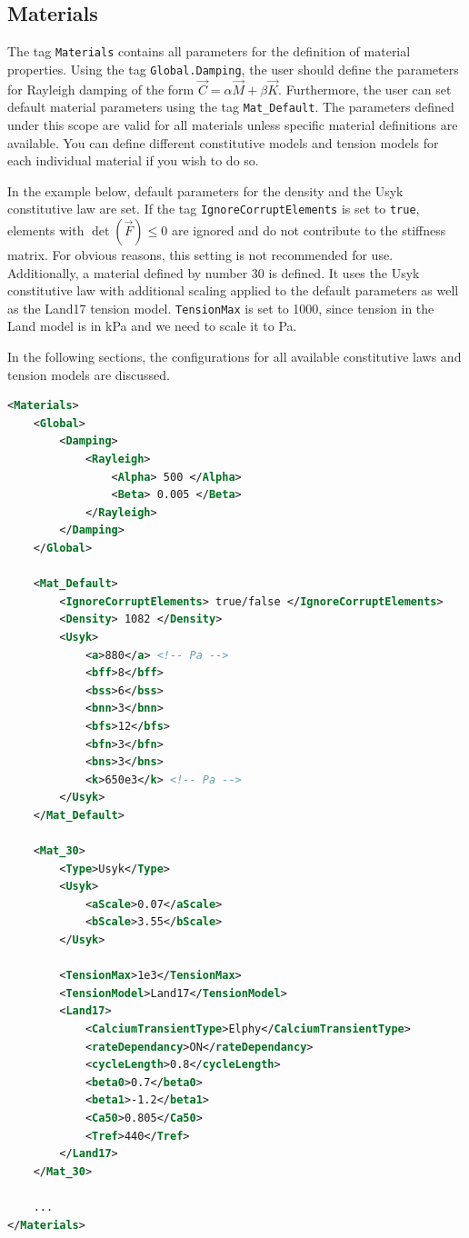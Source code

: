 \subsection{Materials}
\label{settings:Material}

The tag \verb|Materials| contains all parameters for the definition of material properties.
Using the tag \verb|Global.Damping|, the user should define the parameters for Rayleigh damping of the form $\vec C = \alpha \vec M + \beta \vec K$.
Furthermore, the user can set default material parameters using the tag \verb|Mat_Default|.
The parameters defined under this scope are valid for all materials unless specific material definitions are available.
You can define different constitutive models and tension models for each individual material if you wish to do so.

In the example below, default parameters for the density and the Usyk constitutive law are set.
If the tag \verb|IgnoreCorruptElements| is set to \verb|true|, elements with $\det(\vec F) \leq 0$ are ignored and do not contribute to the stiffness matrix.
For obvious reasons, this setting is not recommended for use.
Additionally, a material defined by number 30 is defined.
It uses the Usyk constitutive law with additional scaling applied to the default parameters as well as the Land17 tension model.
\verb|TensionMax| is set to 1000, since tension in the Land model is in \si{kPa} and we need to scale it to \si{Pa}.

In the following sections, the configurations for all available constitutive laws and tension models are discussed.

\begin{lstlisting}[language=XML,caption=.xml settings for material definitions]
<Materials>
    <Global>
        <Damping>
            <Rayleigh>
                <Alpha> 500 </Alpha>
                <Beta> 0.005 </Beta>
            </Rayleigh>
        </Damping>
    </Global>

    <Mat_Default>
        <IgnoreCorruptElements> true/false </IgnoreCorruptElements>
        <Density> 1082 </Density>
        <Usyk>
            <a>880</a> <!-- Pa -->
            <bff>8</bff>
            <bss>6</bss>
            <bnn>3</bnn>
            <bfs>12</bfs>
            <bfn>3</bfn>
            <bns>3</bns>
            <k>650e3</k> <!-- Pa -->
        </Usyk>
    </Mat_Default>
    
    <Mat_30> 
        <Type>Usyk</Type>
        <Usyk>
            <aScale>0.07</aScale>
            <bScale>3.55</bScale>
        </Usyk>

        <TensionMax>1e3</TensionMax>
        <TensionModel>Land17</TensionModel>
        <Land17>
            <CalciumTransientType>Elphy</CalciumTransientType>
            <rateDependancy>ON</rateDependancy>
            <cycleLength>0.8</cycleLength>
            <beta0>0.7</beta0>
            <beta1>-1.2</beta1>
            <Ca50>0.805</Ca50>
            <Tref>440</Tref>
        </Land17>
    </Mat_30>
    
    ...
</Materials>
\end{lstlisting}

